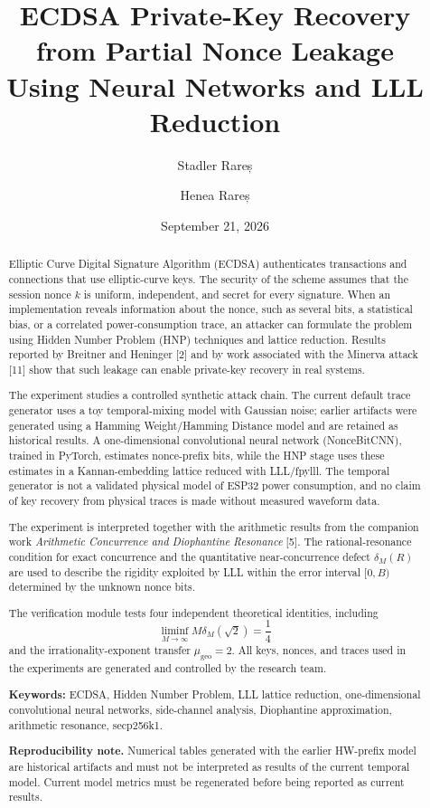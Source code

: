 \documentclass[11pt,a4paper]{article}
\title{\textbf{ECDSA Private-Key Recovery from Partial Nonce Leakage}\\
\large Using Neural Networks and LLL Reduction}
\author{Stadler Rareș \and Henea Rareș}
\date{September 21, 2026}
\begin{document}
\maketitle

\begin{abstract}
Elliptic Curve Digital Signature Algorithm (ECDSA) authenticates transactions and connections that use elliptic-curve keys. The security of the scheme assumes that the session nonce $k$ is uniform, independent, and secret for every signature. When an implementation reveals information about the nonce, such as several bits, a statistical bias, or a correlated power-consumption trace, an attacker can formulate the problem using Hidden Number Problem (HNP) techniques and lattice reduction. Results reported by Breitner and Heninger [2] and by work associated with the Minerva attack [11] show that such leakage can enable private-key recovery in real systems.

The experiment studies a controlled synthetic attack chain. The current default trace generator uses a toy temporal-mixing model with Gaussian noise; earlier artifacts were generated using a Hamming Weight/Hamming Distance model and are retained as historical results. A one-dimensional convolutional neural network (NonceBitCNN), trained in PyTorch, estimates nonce-prefix bits, while the HNP stage uses these estimates in a Kannan-embedding lattice reduced with LLL/fpylll. The temporal generator is not a validated physical model of ESP32 power consumption, and no claim of key recovery from physical traces is made without measured waveform data.

The experiment is interpreted together with the arithmetic results from the companion work \emph{Arithmetic Concurrence and Diophantine Resonance} [5]. The rational-resonance condition for exact concurrence and the quantitative near-concurrence defect $\delta_M(R)$ are used to describe the rigidity exploited by LLL within the error interval $[0,B)$ determined by the unknown nonce bits.

The verification module  tests four independent theoretical identities, including
\[
\liminf_{M\to\infty} M\delta_M(\sqrt{2})=\frac14
\]
and the irrationality-exponent transfer $\mu_{\mathrm{geo}}=2$. All keys, nonces, and traces used in the experiments are generated and controlled by the research team.

\textbf{Keywords:} ECDSA, Hidden Number Problem, LLL lattice reduction, one-dimensional convolutional neural networks, side-channel analysis, Diophantine approximation, arithmetic resonance, secp256k1.

\textbf{Reproducibility note.} Numerical tables generated with the earlier HW-prefix model are historical artifacts and must not be interpreted as results of the current temporal model. Current model metrics must be regenerated before being reported as current results.
\end{abstract}
\end{document}
